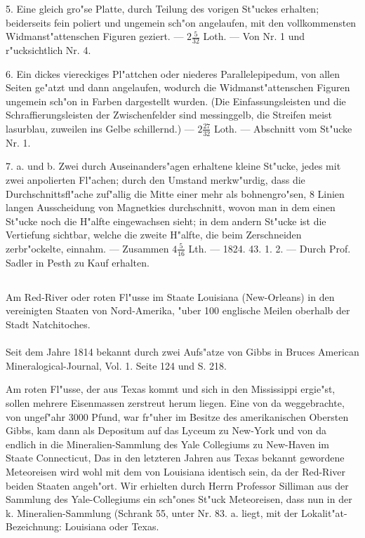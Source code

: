 \documentclass[a4paper, 11pt, oneside, polutonikogreek, german]{article}
\begin{document}
5. Eine gleich gro"se Platte, durch Teilung des vorigen St"uckes erhalten; beiderseits fein poliert und ungemein sch"on angelaufen, mit den vollkommensten Widmanst"attenschen Figuren geziert. --- $\mathfrak{2\frac{5}{32}}$ Loth. --- Von Nr. 1 und r"ucksichtlich Nr. 4.

6. Ein dickes viereckiges Pl"attchen oder niederes Parallelepipedum, von allen Seiten ge"atzt und dann angelaufen, wodurch die Widmanst"attenschen Figuren ungemein sch"on in Farben dargestellt wurden. (Die Einfassungsleisten und die Schraffierungsleisten der Zwischenfelder sind messinggelb, die Streifen meist lasurblau, zuweilen ins Gelbe schillernd.) --- $\mathfrak{2\frac{27}{32}}$ Loth. --- Abschnitt vom St"ucke Nr. 1.

7. a. und b. Zwei durch Auseinanders"agen erhaltene kleine St"ucke, jedes mit zwei anpolierten Fl"achen; durch den Umstand merkw"urdig, dass die Durchschnittsfl"ache zuf"allig die Mitte einer mehr als bohnengro"sen, 8 Linien langen Ausscheidung von Magnetkies durchschnitt, wovon man in dem einen St"ucke noch die H"alfte eingewachsen sieht; in dem andern St"ucke ist die Vertiefung sichtbar, welche die zweite H"alfte, die beim Zerschneiden zerbr"ockelte, einnahm. --- Zusammen $\mathfrak{4\frac{5}{16}}$ Lth. --- 1824. 43. 1. 2. --- Durch Prof. Sadler in Pesth zu Kauf erhalten.
\subsection{}
\begin{center}

Am Red-River oder roten Fl"usse im Staate Louisiana (New-Orleans) in den vereinigten Staaten von Nord-Amerika, "uber 100 englische Meilen oberhalb der Stadt Natchitoches.
\end{center}
\paragraph{}
Seit dem Jahre 1814 bekannt durch zwei Aufs"atze von Gibbs in Bruces American Mineralogical-Journal, Vol. 1. Seite 124 und S. 218.

\setlength{\leftskip}{10mm}
\setlength{\parindent}{0pt}

{\footnotesize Am roten Fl"usse, der aus Texas kommt und sich in den Mississippi ergie"st, sollen mehrere Eisenmassen zerstreut herum liegen. Eine von da weggebrachte, von ungef"ahr 3000 Pfund, war fr"uher im Besitze des amerikanischen Obersten Gibbs, kam dann als Depositum auf das Lyceum zu New-York und von da endlich in die Mineralien-Sammlung des Yale Collegiums zu New-Haven im Staate Connecticut, Das in den letzteren Jahren aus Texas bekannt gewordene Meteoreisen wird wohl mit dem von Louisiana identisch sein, da der Red-River beiden Staaten angeh"ort. Wir erhielten durch Herrn Professor Silliman aus der Sammlung des Yale-Collegiums ein sch"ones St"uck Meteoreisen, dass nun in der k. Mineralien-Sammlung (Schrank 55, unter Nr. 83. a. liegt, mit der Lokalit"at-Bezeichnung: Louisiana oder Texas.}
\end{document}
